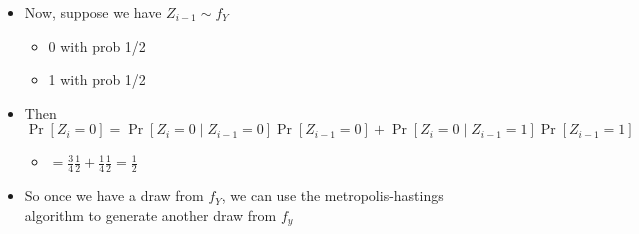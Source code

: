 \begin{itemize}
\begin{itemize}
\begin{itemize}
\end{itemize}
\end{itemize}
\item Now, suppose we have $Z_{i-1} \sim f_Y$
\begin{itemize}
\item 0 with prob 1/2
\item 1 with prob 1/2
\end{itemize}
\item Then $\Pr[Z_i = 0] = \Pr[Z_i = 0 \mid Z_{i-1}=0] \Pr[Z_{i-1} = 0] + \Pr[Z_i = 0 \mid Z_{i-1}=1] \Pr[Z_{i-1} = 1]$
\begin{itemize}
\item $= \frac{3}{4} \frac{1}{2} + \frac{1}{4} \frac{1}{2} = \frac12$
\end{itemize}
\item So once we have a draw from $f_Y$, we can use the
        metropolis-hastings algorithm to generate another draw from $f_y$
\end{itemize}

